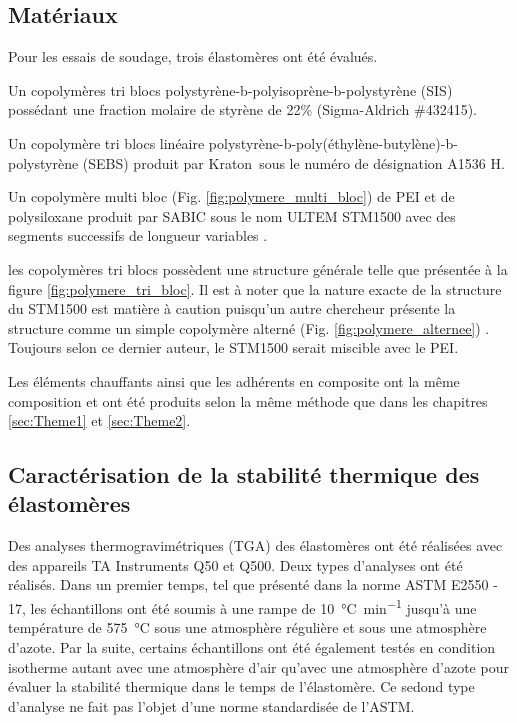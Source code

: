 \subsection{Matériaux}

Pour les essais de soudage, trois élastomères ont été évalués. 
\begin{inparaenum}[]
	\item Un copolymères tri blocs polystyrène-b-polyisoprène-b-polystyrène (SIS) possédant une fraction molaire de styrène de 22\% (Sigma-Aldrich \#432415). 
	\item Un copolymère tri blocs linéaire polystyrène-b-poly(éthylène-butylène)-b-polystyrène (SEBS) produit par Kraton\textregistered \ sous le numéro de désignation A1536 H. 
	\item Un copolymère multi bloc (Fig. \ref{fig:polymere_multi_bloc}) de PEI et de polysiloxane produit par SABIC sous le nom ULTEM STM1500 avec des segments successifs de longueur variables  \cite{mark2013,Holden2002}. 
\end{inparaenum}
les copolymères tri blocs possèdent une structure générale telle que présentée à la figure \ref{fig:polymere_tri_bloc}. 
Il est à noter que la nature exacte de la structure du STM1500 est matière à caution puisqu'un autre chercheur présente la structure comme un simple copolymère alterné (Fig. \ref{fig:polymere_alternee}) \cite{Hatui2015}. 
Toujours selon ce dernier auteur, le STM1500 serait miscible avec le PEI. 

Les éléments chauffants ainsi que les adhérents en composite ont la même composition et ont été produits selon la même méthode que dans les chapitres \ref{sec:Theme1} et \ref{sec:Theme2}. 

\subsection{Caractérisation de la stabilité thermique des élastomères}

Des analyses thermogravimétriques (TGA) des élastomères ont été réalisées avec des appareils TA Instruments Q50 et Q500. 
Deux types d'analyses ont été réalisés. 
Dans un premier temps, tel que présenté dans la norme ASTM E2550 - 17, les échantillons ont été soumis à une rampe de \SI{10}{\celsius\per\minute} jusqu'à une température de \SI{575}{\celsius} sous une atmosphère régulière et sous une atmosphère d'azote. 
Par la suite, certains échantillons ont été également testés en condition isotherme autant avec une atmosphère d'air qu'avec une atmosphère d'azote pour évaluer la stabilité thermique dans le temps de l'élastomère. 
Ce sedond type d'analyse ne fait pas l'objet d'une norme standardisée de l'ASTM. 

